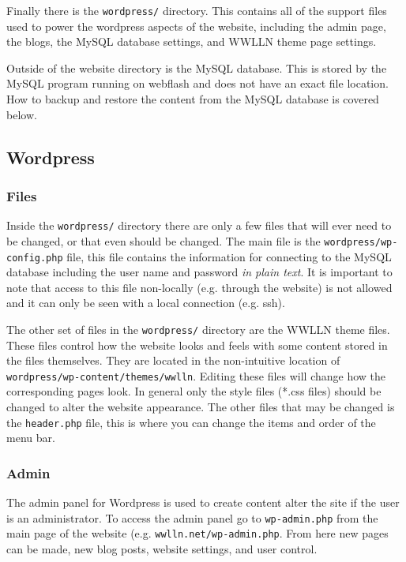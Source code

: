 Finally there is the \texttt{wordpress/} directory.
This contains all of the support files used to power the wordpress aspects of the website, including the  admin page, the blogs, the MySQL database settings, and WWLLN theme page settings.

Outside of the website directory is the MySQL database.  This is stored by the MySQL program running on webflash and does not have an exact file location.  How to backup and restore the content from the MySQL database is covered below.

\subsection{Wordpress}

\subsubsection*{Files}

Inside the \texttt{wordpress/} directory there are only a few files that will ever need to be changed, or that even should be changed.
The main file is the \texttt{wordpress/wp-config.php} file, this file contains the information for connecting to the MySQL database including the user name and password \emph{in plain text}.
It is important to note that access to this file non-locally (e.g. through the website) is not allowed and it can only be seen with a local connection (e.g. ssh).

The other set of files in the \texttt{wordpress/} directory are the WWLLN theme files.
These files control how the website looks and feels with some content stored in the files themselves.
They are located in the non-intuitive location of \texttt{wordpress/wp-content/themes/wwlln}.
Editing these files will change how the corresponding pages look.
In general only the style files (*.css files) should be changed to alter the website appearance.
The other files that may be changed is the \texttt{header.php} file, this is where you can change the items and order of the menu bar.

\subsubsection*{Admin}

The admin panel for Wordpress is used to create content alter the site if the user is an administrator.
To access the admin panel go to \texttt{wp-admin.php} from the main page of the website (e.g. \texttt{wwlln.net/wp-admin.php}.
From here new pages can be made, new blog posts, website settings, and user control.

